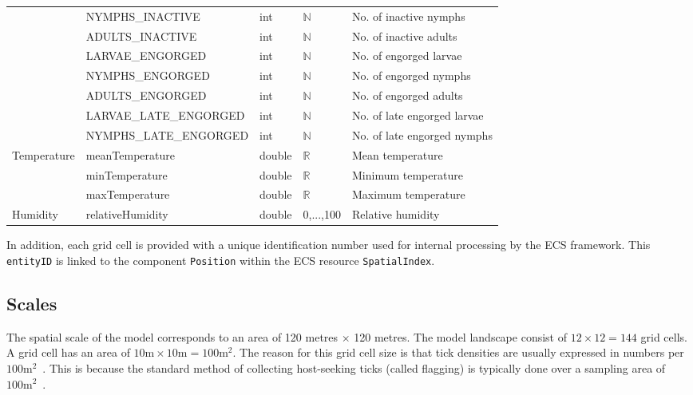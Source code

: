 \documentclass[a4paper, 11pt]{scrartcl}
\newcommand{\inlinecode}[1]{\texttt{\small #1}}
\begin{document}
\begin{table}[H]
\begin{tabularx}{\textwidth}{lllll}
							& \footnotesize{NYMPHS\_INACTIVE}	& int & $\mathbb{N}$ & \footnotesize{No. of inactive nymphs} \\
							& \footnotesize{ADULTS\_INACTIVE}	& int & $\mathbb{N}$ & \footnotesize{No. of inactive adults} \\
							& \footnotesize{LARVAE\_ENGORGED}	& int & $\mathbb{N}$ & \footnotesize{No. of engorged larvae} \\
							& \footnotesize{NYMPHS\_ENGORGED}	& int & $\mathbb{N}$ & \footnotesize{No. of engorged nymphs} \\
							& \footnotesize{ADULTS\_ENGORGED}	& int & $\mathbb{N}$ & \footnotesize{No. of engorged adults} \\
							& \tiny{LARVAE\_LATE\_ENGORGED}		& int & $\mathbb{N}$ & \footnotesize{No. of late engorged larvae} \\
							& \tiny{NYMPHS\_LATE\_ENGORGED}		& int & $\mathbb{N}$ & \footnotesize{No. of late engorged nymphs} \\
\midrule
\multirow{3}{*}{\footnotesize{Temperature}} & \small{meanTemperature}  & double  	& $\mathbb{R}$ & \footnotesize{Mean temperature} \\
							& \footnotesize{minTemperature}   & double  	& $\mathbb{R}$ & \footnotesize{Minimum temperature} \\
							& \footnotesize{maxTemperature}   & double  	& $\mathbb{R}$ & \footnotesize{Maximum temperature} \\
\footnotesize{Humidity} 	& \footnotesize{relativeHumidity} & double  	& 0,...,100 & \footnotesize{Relative humidity} \\
\bottomrule
\end{tabularx}
\end{table}

In addition, each grid cell is provided with a unique identification number used for internal processing by the ECS framework. This \inlinecode{entityID} is linked to the component \inlinecode{Position} within the ECS resource \inlinecode{SpatialIndex}.


\subsection{Scales}
The spatial scale of the model corresponds to an area of 120 metres $\times$ 120 metres. The model landscape consist of $12 \times 12 = 144$ grid cells. A grid cell has an area of $10 \mathrm{m} \times 10 \mathrm{m} = 100 \mathrm{m}^{2}$. The reason for this grid cell size is that tick densities are usually expressed in numbers per $100 \mathrm{m}^{2}$~\parencite[see e.g.][Table 2]{Boehnke.2015}. This is because the standard method of collecting host-seeking ticks (called flagging) is typically done over a sampling area of $100 \mathrm{m}^{2}$~\parencite{Brugger.2016, Schulz.2014}.
\end{document}
